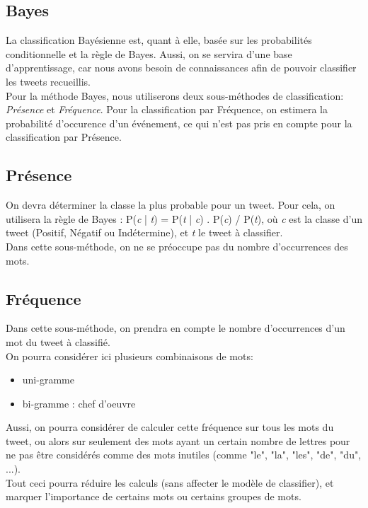 \documentclass[pdftex,12pt,a4paper]{report}
\begin{document}
\begin{spacing}{1.2}
\section{Bayes}

La classification Bayésienne est, quant à elle, basée sur les probabilités conditionnelle et la règle de Bayes. Aussi, on se servira d'une base d'apprentissage, car nous avons besoin de connaissances afin de pouvoir classifier les tweets recueillis.\\
Pour la méthode Bayes, nous utiliserons deux sous-méthodes de classification: \textit{Présence} et \textit{Fréquence}. Pour la classification par Fréquence, on estimera la probabilité d'occurence d'un événement, ce qui n'est pas pris en compte pour la classification par Présence.

\subsection{Présence}

On devra déterminer la classe la plus probable pour un tweet. Pour cela, on utilisera la règle de Bayes : P(\textit{c} | \textit{t}) = P(\textit{t} | \textit{c}) . P(\textit{c}) / P(\textit{t}), où \textit{c} est la classe d'un tweet (Positif, Négatif ou Indétermine), et \textit{t} le tweet à classifier.
\\
Dans cette sous-méthode, on ne se préoccupe pas du nombre d'occurrences des mots.

\subsection{Fréquence}

Dans cette sous-méthode, on prendra en compte le nombre d'occurrences d'un mot du tweet à classifié.
\\
On pourra considérer ici plusieurs combinaisons de mots:
\begin{itemize}
\item{uni-gramme}
\item{bi-gramme : chef d'oeuvre}
\end{itemize}
Aussi, on pourra considérer de calculer cette fréquence sur tous les mots du tweet, ou alors sur seulement des mots ayant un certain nombre de lettres pour ne pas être considérés comme des mots inutiles (comme "le", "la", "les", "de", "du", ...).
\\
Tout ceci pourra réduire les calculs (sans affecter le modèle de classifier), et marquer l'importance de certains mots ou certains groupes de mots. 


\end{spacing}
\end{document}
